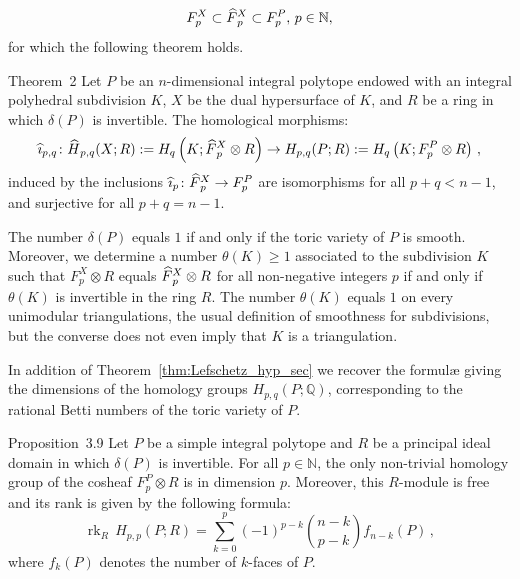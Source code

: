 \documentclass[AHL,Unicode,longabstracts,published]{cedram}
\newcommand{\Q}{\mathbb{Q}}
\newcommand{\N}{\mathbb{N}}
\DeclareMathOperator{\rk}{rk}
\newcommand{\Fbar}{\hat{F}}
\newcommand{\Hbar}{\hat{H}}
\newcommand{\ibar}{\hat{\imath}}
\let\oldhat\hat
\renewcommand*{\hat}[1]{\mathchoice{\widehat{#1}}{\widehat{#1}}{\oldhat{#1}}{\oldhat{#1}}}
\begin{document}
\begin{equation*}
F^{X}_p\subset \Fbar^X_p\subset F^{P}_p,\,p\in\N,
\end{equation*}
for which the following theorem holds.

\begin{enonce*}{Theorem~2}
Let $P$ be an $n$-dimensional integral polytope endowed with an integral polyhedral subdivision $K$, $X$ be the dual hypersurface of $K$, and $R$ be a ring in which $\delta(P)$ is invertible. The homological morphisms:
\begin{equation*}
\ibar_{p,q}\colon \Hbar_{p,q}(X;R):=H_q\left(K;\Fbar^X_p\otimes R\right) \rightarrow H_{p,q}(P; R):= H_q\left(K; F^P_p\otimes R\right)\,,
\end{equation*}
induced by the inclusions $\ibar_p\colon \Fbar_p^{X}\rightarrow F_p^{P}$ are isomorphisms for all $p+q<n-1$, and surjective for all $p+q=n-1$.
\end{enonce*}

The number $\delta(P)$ equals $1$ if and only if the toric variety of $P$ is smooth. Moreover, we determine a number $\theta(K)\geq 1$ associated to the subdivision $K$ such that $F^X_p\otimes R$ equals $\Fbar^X_p\otimes R$ for all non-negative integers $p$ if and only if $\theta(K)$ is invertible in the ring $R$. The number $\theta(K)$ equals $1$ on every unimodular triangulations, the usual definition of smoothness for subdivisions, but the converse does not even imply that $K$ is a triangulation.


In addition of Theorem~\ref{thm:Lefschetz_hyp_sec} we recover the formul{\ae} giving the dimensions of the homology groups $H_{p,q}(P;\Q)$, corresponding to the rational Betti numbers of the toric variety of $P$.

\begin{enonce*}{Proposition~3.9}
Let $P$ be a simple integral polytope and $R$ be a principal ideal domain in which $\delta(P)$ is invertible. For all $p\in\N$, the only non-trivial homology group of the cosheaf $F^{P}_p\otimes R$ is in dimension $p$. Moreover, this $R$-module is free and its rank is given by the following formula:
\begin{equation*}
\rk_R\, H_{p,p}(P;R) = \sum_{k=0}^p(-1)^{p-k} \binom{n-k}{p-k}f_{n-k}(P)\,,
\end{equation*}
where $f_k(P)$ denotes the number of $k$-faces of $P$.
\end{enonce*}
\end{document}
